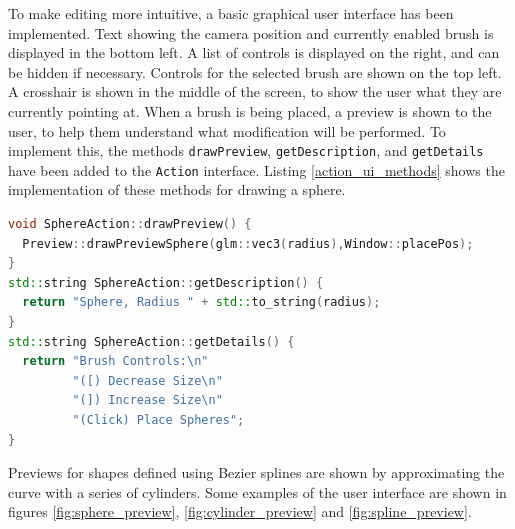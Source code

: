 \documentclass[11pt]{article}
\begin{document}
To make editing more intuitive, a basic graphical user interface has been implemented. Text showing the camera position and currently enabled brush is displayed in the bottom left. A list of controls is displayed on the right, and can be hidden if necessary. Controls for the selected brush are shown on the top left. A crosshair is shown in the middle of the screen, to show the user what they are currently pointing at. When a brush is being placed, a preview is shown to the user, to help them understand what modification will be performed. To implement this, the methods \texttt{drawPreview}, \texttt{getDescription}, and \texttt{getDetails} have been added to the \texttt{Action} interface. Listing \ref{action_ui_methods} shows the implementation of these methods for drawing a sphere.

\begin{lstlisting}[language=C++,label={action_ui_methods},caption={The UI methods for the \texttt{SphereAction} class.}]
void SphereAction::drawPreview() {
  Preview::drawPreviewSphere(glm::vec3(radius),Window::placePos);
}
std::string SphereAction::getDescription() {
  return "Sphere, Radius " + std::to_string(radius);
}
std::string SphereAction::getDetails() {
  return "Brush Controls:\n"
         "([) Decrease Size\n"
         "(]) Increase Size\n"
         "(Click) Place Spheres";
}
\end{lstlisting}

Previews for shapes defined using Bezier splines are shown by approximating the curve with a series of cylinders. Some examples of the user interface are shown in figures \ref{fig:sphere_preview}, \ref{fig:cylinder_preview} and \ref{fig:spline_preview}.
\end{document}
